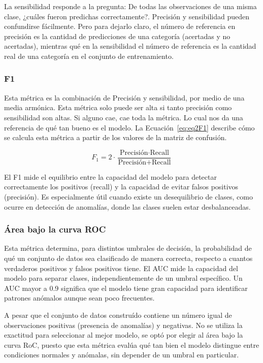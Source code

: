 \documentclass[11pt,a4paper,spanish]{book}
\numberwithin{equation}{chapter}
\numberwithin{figure}{chapter}
\begin{document}
La sensibilidad responde a la pregunta: De todas las observaciones de una misma clase, 
¿cuáles fueron predichas correctamente?. Precisión y sensibilidad pueden confundirse 
fácilmente. Pero para dejarlo claro, el número de referencia en precisión es la 
cantidad de predicciones de una categoría (acertadas y no acertadas), mientras qué en 
la sensibilidad el número de referencia es la cantidad real de una categoría en el 
conjunto de entrenamiento.


\subsubsection{F1}

Esta métrica es la combinación de Precisión y sensibilidad, por medio de una media 
armónica. Esta métrica solo puede ser alta si tanto precisión como sensibilidad son 
altas. Si alguno cae, cae toda la métrica. Lo cual nos da una referencia de qué tan 
bueno es el modelo. La Ecuación~\eqref{eq:eq2F1} describe cómo se calcula esta métrica 
a partir de los valores de la matriz de confusión. 

\begin{equation}\label{eq:eq2F1}
F_1 = 2 \cdot \frac{\text{Precisión} \cdot \text{Recall}}{\text{Precisión} + \text{Recall}}
\end{equation}


El F1 mide el equilibrio entre la capacidad del modelo para detectar correctamente los 
positivos (recall) y la capacidad de evitar falsos positivos (precisión). 
Es especialmente útil cuando existe un desequilibrio de clases, como ocurre en detección 
de anomalías, donde las clases suelen estar desbalanceadas. 


\subsubsection{Área bajo la curva ROC}

Esta métrica determina, para distintos umbrales de decisión, la probabilidad de qué un 
conjunto de datos sea clasificado de manera correcta, respecto a cuantos verdaderos 
positivos y falsos positivos tiene. El AUC mide la capacidad del modelo para separar 
clases, independientemente de un umbral específico. Un AUC mayor a 0.9 significa que el 
modelo tiene gran capacidad para identificar patrones anómalos aunque sean poco frecuentes.

A pesar que el conjunto de datos construído contiene un número igual de observaciones 
positivas (presencia de anomalías) y negativas. No se utiliza la exactitud para 
seleccionar al mejor modelo, se optó por elegir al área bajo la curva RoC, puesto que 
esta métrica evalúa qué tan bien el modelo distingue entre condiciones normales y 
anómalas, sin depender de un umbral en particular. 
\end{document}

